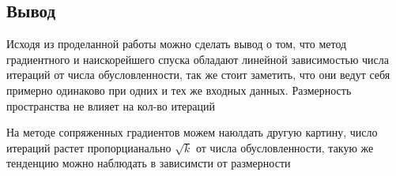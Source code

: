 \documentclass[a4paper, 14pt]{article}
\begin{document}
		\subsection*{Вывод}
		 Исходя из проделанной работы можно сделать вывод о том, что метод градиентного и наискорейшего спуска обладают линейной зависимостью числа итераций от числа обусловленности, так же стоит заметить, что они ведут себя примерно одинаково при одних и тех же входных данных. Размерность пространства не влияет на кол-во итераций 
		 
		 На методе сопряженных градиентов можем наюлдать другую картину, число итераций растет пропорцианально $\sqrt{k}$ от числа обусловленности, такую же тенденцию можно наблюдать в зависимсти от размерности
		 
			

		
		

  
\end{document}
